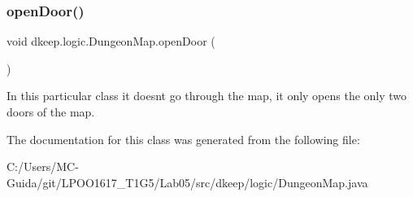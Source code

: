 \subsubsection{\texorpdfstring{open\+Door()}{openDoor()}}
{\footnotesize\ttfamily void dkeep.\+logic.\+Dungeon\+Map.\+open\+Door (\begin{DoxyParamCaption}{ }\end{DoxyParamCaption})}

In this particular class it doesn\textquotesingle{}t go through the map, it only opens the only two doors of the map. 

The documentation for this class was generated from the following file\+:\begin{DoxyCompactItemize}
\item 
C\+:/\+Users/\+M\+C-\/\+Guida/git/\+L\+P\+O\+O1617\+\_\+\+T1\+G5/\+Lab05/src/dkeep/logic/Dungeon\+Map.\+java\end{DoxyCompactItemize}
